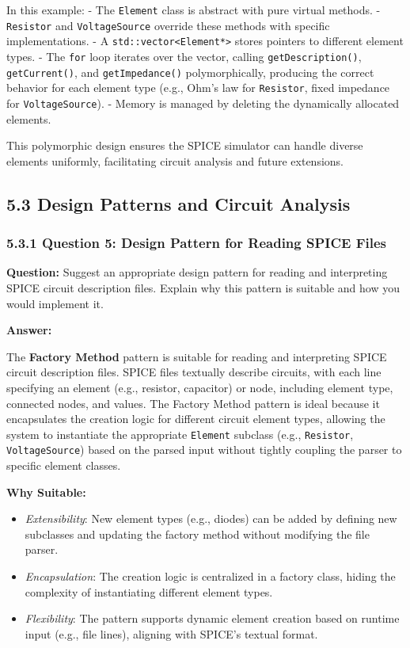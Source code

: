 \documentclass{article}
\begin{document}
In this example:
- The \texttt{Element} class is abstract with pure virtual methods.
- \texttt{Resistor} and \texttt{VoltageSource} override these methods with specific implementations.
- A \texttt{std::vector<Element*>} stores pointers to different element types.
- The \texttt{for} loop iterates over the vector, calling \texttt{getDescription()}, \texttt{getCurrent()}, and \texttt{getImpedance()} polymorphically, producing the correct behavior for each element type (e.g., Ohm’s law for \texttt{Resistor}, fixed impedance for \texttt{VoltageSource}).
- Memory is managed by deleting the dynamically allocated elements.

This polymorphic design ensures the SPICE simulator can handle diverse elements uniformly, facilitating circuit analysis and future extensions.





\subsection*{5.3 Design Patterns and Circuit Analysis}

\subsubsection*{5.3.1 Question 5: Design Pattern for Reading SPICE Files}

\textbf{Question:} Suggest an appropriate design pattern for reading and interpreting SPICE circuit description files. Explain why this pattern is suitable and how you would implement it.

\textbf{Answer:}

The \textbf{Factory Method} pattern is suitable for reading and interpreting SPICE circuit description files. SPICE files textually describe circuits, with each line specifying an element (e.g., resistor, capacitor) or node, including element type, connected nodes, and values. The Factory Method pattern is ideal because it encapsulates the creation logic for different circuit element types, allowing the system to instantiate the appropriate \texttt{Element} subclass (e.g., \texttt{Resistor}, \texttt{VoltageSource}) based on the parsed input without tightly coupling the parser to specific element classes.

\textbf{Why Suitable:}
\begin{itemize}
    \item \textit{Extensibility}: New element types (e.g., diodes) can be added by defining new subclasses and updating the factory method without modifying the file parser.
    \item \textit{Encapsulation}: The creation logic is centralized in a factory class, hiding the complexity of instantiating different element types.
    \item \textit{Flexibility}: The pattern supports dynamic element creation based on runtime input (e.g., file lines), aligning with SPICE’s textual format.
\end{itemize}
\end{document}
